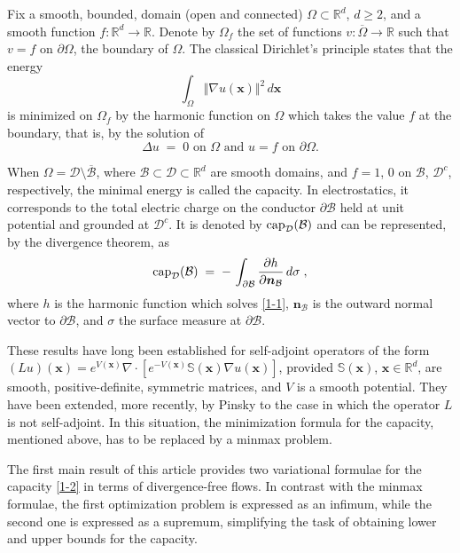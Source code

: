 \documentclass[reqno]{amsart}
\newcounter{as}[section]
\newcommand{\mc}[1]{{\mathcal #1}}
\newcommand{\bb}[1]{{\mathbb #1}}
\newcommand{\bs}[1]{{\boldsymbol #1}}
\newcommand{\<}{\langle}
\renewcommand{\>}{\rangle}
\renewcommand{\Cap}{{\rm cap}}
\begin{document}
Fix a smooth, bounded, domain (open and connected) $\Omega \subset\bb
R^d$, $d\ge 2$, and a smooth function $f\colon \bb R^d\to\bb R$. Denote by
$\Omega_f$ the set of functions $v\colon \overline{\Omega} \to \bb R$ such
that $v = f$ on $\partial \Omega$, the boundary of $\Omega$.  The
classical Dirichlet's principle \cite{K12, AH96} states that the energy
\begin{equation*}
\int_{\Omega} \Vert \nabla u(\bs{x}) \Vert^2 \, d\bs{x}
\end{equation*}
is minimized on $\Omega_f$ by the harmonic function on $\Omega$ which
takes the value $f$ at the boundary, that is, by the solution of
\begin{equation}
\label{1-1}
\text{$\Delta u \;=\; 0 $ on $\Omega$  and $u=f$ on $\partial\Omega$.}
\end{equation}

When $\Omega = \mc D\setminus \overline{\mc B}$, where $\mc B\subset
\mc D\subset \bb R^d$ are smooth domains, and $f=1$, $0$ on $\mc B$,
$\mc D^c$, respectively, the minimal energy is called the capacity. In
electrostatics, it corresponds to the total electric charge on the
conductor $\partial \mc B$ held at unit potential and grounded at $\mc
D^c$. It is denoted by $\Cap_\mc D(\mc B)$ and can be represented, by
the divergence theorem, as
\begin{equation}
\label{1-2}
\Cap_\mc D(\mc B) \;=\;
-\, \int_{\partial \mc B} \frac{\partial h}{\partial \bs n_\mc B} \, d \sigma \;,
\end{equation}
where $h$ is the harmonic function which solves \eqref{1-1}, $\bs n_\mc B$
is the outward normal vector to $\partial \mc B$, and $\sigma$ the surface
measure at $\partial \mc B$.

These results have long been established for self-adjoint operators of
the form $(Lu)(\bs{x}) = e^{V(\bs{x})} \nabla \cdot [ e^{-V(\bs{x})} \bb S(\bs{x}) \nabla
u (\bs{x})]$, provided $\bb S(\bs x)$, $\bs x\in\bb R^d$, are smooth, positive-definite, symmetric
matrices, and $V$ is a smooth potential. They have been extended, more
recently, by Pinsky \cite{p1, p95} to the case in which the operator
$L$ is not self-adjoint. In this situation, the minimization formula
for the capacity, mentioned above, has to be replaced by a minmax
problem.

The first main result of this article provides two variational
formulae for the capacity \eqref{1-2} in terms of divergence-free
flows. In contrast with the minmax formulae, the first optimization
problem is expressed as an infimum, while the second one is expressed
as a supremum, simplifying the task of obtaining lower and upper
bounds for the capacity.
\end{document}
